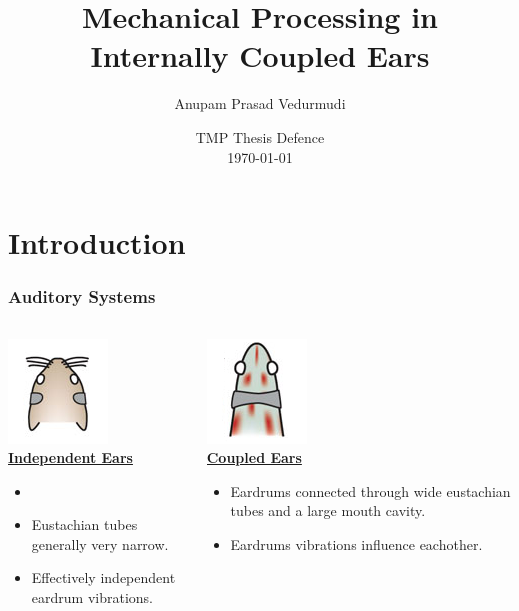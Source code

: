 \documentclass{beamer}
\title{\Large Mechanical Processing in Internally Coupled Ears}
\author{Anupam Prasad Vedurmudi}
\date{TMP Thesis Defence\\ \today}
\begin{document}
\begin{frame}[t]
 \titlepage
 

\end{frame}


\section{Introduction}
\begin{frame}[t]
\frametitle{Auditory Systems}

 \begin{columns}
 
    \begin{column}{0.5\textwidth}
    \centering
    \includegraphics[width = 1.5 cm]{Diagrams/Presentation/indepears.png}\\
    \underline{\textbf{Independent Ears}}
    \small
     \begin{itemize}
     \item[]
    \item[] Eustachian tubes generally very narrow.
     \item[] Effectively independent eardrum vibrations.
     \end{itemize}
    \end{column}
     
    \begin{column}{0.5\textwidth}
    \centering
    \includegraphics[width = 1.5 cm]{Diagrams/Presentation/coupledears.png}\\
    \underline{\textbf{Coupled Ears}}
    \small
     \begin{itemize}
         \item[] Eardrums connected through wide eustachian tubes and a large mouth cavity.
     \item[] Eardrums vibrations influence eachother.
     \end{itemize}
    \end{column}
    
  \end{columns}
  
\end{frame}
\end{document}
